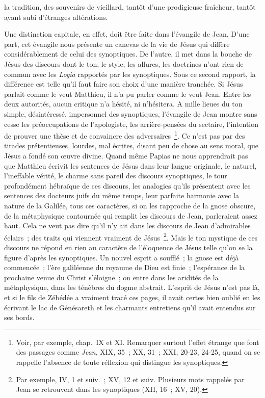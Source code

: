 \documentclass[french,twoside]{book} %
\begin{document}
la tradition, des souvenirs de vieillard, tantôt d’une prodigieuse fraîcheur, tantôt ayant subi d’étranges altérations.\par
Une distinction capitale, en effet, doit être faite dans l’évangile de Jean. D’une part, cet évangile nous présente un canevas de la vie de Jésus qui diffère considérablement de celui des synoptiques. De l’autre, il met dans la bouche de Jésus des discours dont le ton, le style, les allures, les doctrines n’ont rien de commun avec les {\itshape Logia} rapportés par les synoptiques. Sous ce second rapport, la différence est telle qu’il faut faire son choix d’une manière tranchée. Si Jésus parlait comme le veut Matthieu, il n’a pu parler comme le veut Jean. Entre les deux autorités, aucun critique n’a hésité, ni n’hésitera. A mille lieues du ton simple, désintéressé, impersonnel des synoptiques, l’évangile de Jean montre sans cesse les préoccupations de l’apologiste, les arrière-pensées du sectaire, l’intention de prouver une thèse et de convaincre des adversaires \footnote{ Voir, par exemple, chap. IX et XI. Remarquer surtout l’effet étrange que font des passages comme {\itshape Jean}, XIX, 35 ; XX, 31 ; XXI, 20-23, 24-25, quand on se rappelle l’absence de toute réflexion qui distingue les synoptiques.}. Ce n’est pas par des tirades prétentieuses, lourdes, mal écrites, disant peu de chose au sens moral, que Jésus a fondé son œuvre divine. Quand même Papias ne nous apprendrait pas que Matthieu écrivit les sentences de Jésus dans leur langue originale, le naturel, l’ineffable vérité, le charme sans pareil des discours synoptiques, le tour profondément hébraïque de ces discours, les analogies qu’ils présentent avec les sentences des docteurs juifs du même temps, leur parfaite harmonie avec la nature de la Galilée, tous ces caractères, si on les rapproche de la gnose obscure, de la métaphysique contournée qui remplit les discours de Jean, parleraient assez haut. Cela ne veut pas dire qu’il n’y ait dans les discours de Jean d’admirables éclairs ; des traits qui viennent vraiment de Jésus \footnote{Par exemple, IV, 1 et suiv. ; XV, 12 et suiv. Plusieurs mots rappelés par Jean se retrouvent dans les synoptiques (XII, 16 ; XV, 20).}. Mais le ton mystique de ces discours ne répond en rien au caractère de l’éloquence de Jésus telle qu’on se la figure d’après les synoptiques. Un nouvel esprit a soufflé ; la gnose est déjà commencée ; l’ère galiléenne du royaume de Dieu est finie ; l’espérance de la prochaine venue du Christ s’éloigne ; on entre dans les aridités de la métaphysique, dans les ténèbres du dogme abstrait. L’esprit de Jésus n’est pas là, et si le fils de Zébédée a vraiment tracé ces pages, il avait certes bien oublié en les écrivant le lac de Génésareth et les charmants entretiens qu’il avait entendus sur ses bords.\par
\end{document}
